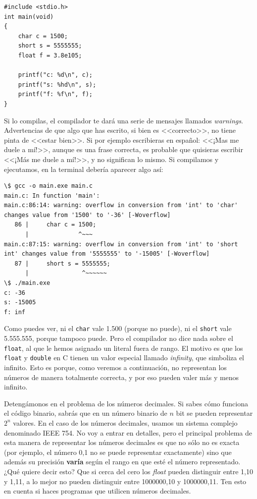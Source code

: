 \documentclass[a4paper]{article}
\begin{document}
\noindent
\begin{minipage}[H]{\linewidth}
\mbox{}
\begin{lstlisting}[style=C, caption={Asignaciones inválidas},
label={lst:invalidAssignations}]
#include <stdio.h>
int main(void)
{
    char c = 1500;
    short s = 5555555;
    float f = 3.8e105;

    printf("c: %d\n", c);
    printf("s: %hd\n", s);
    printf("f: %f\n", f);
}
\end{lstlisting}
\end{minipage}


Si lo compilas, el compilador te dará una serie de mensajes llamados
\textit{warnings}. Advertencias de que algo que has escrito, si bien es
<<correcto>>, no tiene pinta de <<estar bien>>. Si por ejemplo escribieras
en español: <<¡Mas me duele a mí!>>, aunque es una frase correcta, es probable
que quisieras escribir <<¡Más me duele a mí!>>, y no significan lo mismo. Si
compilamos y ejecutamos, en la terminal debería aparecer algo así:


\noindent
\begin{minipage}[H]{\linewidth}
\mbox{}
\begin{lstlisting}[style=terminalStyle]
\$ gcc -o main.exe main.c
main.c: In function 'main':
main.c:86:14: warning: overflow in conversion from 'int' to 'char' changes value from '1500' to '-36' [-Woverflow]
   86 |     char c = 1500;
      |              ^~~~
main.c:87:15: warning: overflow in conversion from 'int' to 'short int' changes value from '5555555' to '-15005' [-Woverflow]
   87 |     short s = 5555555;
      |               ^~~~~~~
\$ ./main.exe
c: -36
s: -15005
f: inf
\end{lstlisting}
\end{minipage}


Como puedes ver, ni el \texttt{char} vale 1.500 (porque no puede), ni el
\texttt{short} vale 5.555.555, porque tampoco puede. Pero el compilador no dice
nada sobre el \texttt{float}, al que le hemos asignado un literal fuera de
rango. El motivo es que los \texttt{float} y \texttt{double} en C tienen un
valor especial llamado \textit{infinity}, que simboliza el infinito. Esto es
porque, como veremos a continuación, no representan los números de manera
totalmente correcta, y por eso pueden valer más y menos infinito.

Detengámonos en el problema de los números decimales. Si sabes cómo funciona
el código binario, sabrás que en un número binario de $n$ bit se pueden
representar $2^n$ valores. En el caso de los números decimales, usamos un
sistema complejo denominado IEEE 754. No voy a entrar en detalles, pero el
principal problema de esta manera de representar los números decimales es que
no sólo no es exacta (por ejemplo, el número 0,1 no se puede representar
exactamente) sino que además su precisión \textbf{varía} según el rango en que
esté el número representado. ¿Qué quiere decir esto? Que si cerca del cero los
\textit{float} pueden distinguir entre 1,10 y 1,11, a lo mejor no pueden
distinguir entre 1000000,10 y 1000000,11. Ten esto en cuenta si haces
programas que utilicen números decimales.
\end{document}
